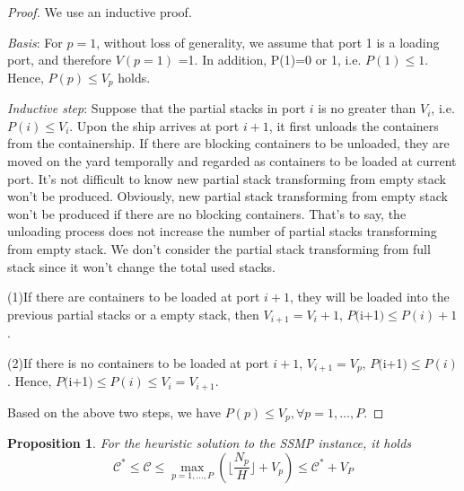 \documentclass[review,3p,times,authoryear,12pt]{elsarticle}
\newtheorem{proposition}{Proposition}
\begin{document}
\begin{proof}

We use an inductive proof.

\textit{Basis}: For $p=1$, without loss of generality, we assume that port 1 is a loading port, and therefore $V(p=1)$ =1.
In addition, P(1)=0 or 1, i.e. $P(1) \le 1$. Hence, $P(p) \le V_p $ holds.

\textit{Inductive step}: Suppose that the partial stacks in port $i$ is no greater than $V_i$, i.e. $P(i) \le V_i $.
Upon the ship arrives at port $i+1$, it first unloads the containers from the containership.
If there are blocking containers to be unloaded, they are moved on the yard temporally and regarded as containers to be loaded at current port.
It's not difficult to know new partial stack transforming from empty stack won't be produced.
Obviously, new partial stack transforming from empty stack won't be produced if there are no blocking containers.
That's to say, the unloading process does not increase the number of partial stacks transforming from empty stack.
We don't consider the partial stack transforming from full stack since it won't change the total used stacks.

(1)If there are containers to be loaded at port $i+1$, they will be loaded into the previous partial stacks or a empty stack, then $V_{i+1}=V_i+1$,  $P($i+1$) \le P(i)+1$.

(2)If there is no containers to be loaded at port $i+1$,  $V_{i+1}=V_p$, $P($i+1$) \le P(i)$. Hence, $P($i+1$) \le P(i) \le V_{i}=V_{i+1}$.

Based on the above two steps, we have $P(p) \le V_p,  \forall p=1,\ldots,P$.
\end{proof}


\begin{proposition}
For the heuristic solution to the SSMP instance, it holds
\begin{equation*}
\mathcal{C}^* \le \mathcal{C} \le \max_{p=1,\ldots,P}(\lfloor\frac{N_p}{H}\rfloor+V_p) \le \mathcal{C}^*+V_P
\end{equation*}
\label{pro:a3}
\end{proposition}
\end{document}
